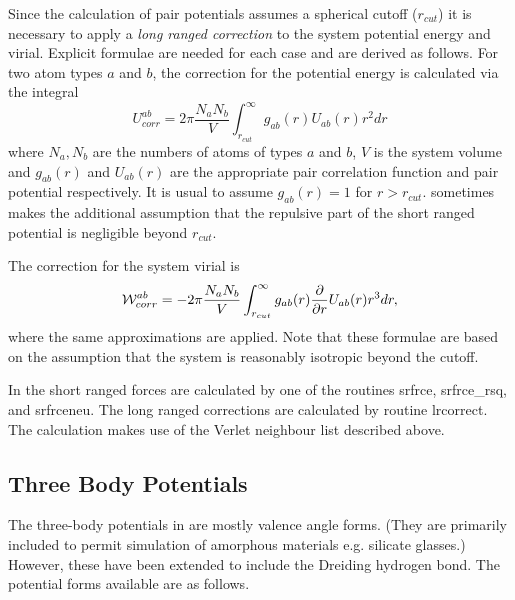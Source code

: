Since the calculation of pair potentials assumes a spherical cutoff
($r_{cut}$) it is necessary to apply a {\em long ranged
correction} to
the system potential energy and virial. Explicit formulae are needed
for each case and are derived as follows. For two atom types $a$ and
$b$, the correction for the potential energy is calculated via the
integral
\begin{equation}
U_{corr}^{ab}=2\pi
\frac{N_{a}N_{b}}{V}\int_{r_{cut}}^{\infty}g_{ab}(r)U_{ab}(r)r^{2}dr
\end{equation}
where $N_{a},N_{b}$ are the numbers of atoms of types $a$ and $b$, $V$
is the system volume and $g_{ab}(r)$ and $U_{ab}(r)$ are the
appropriate pair correlation function and pair potential respectively.
It is usual to assume $g_{ab}(r)=1$ for $r>r_{cut}$. \D{}
sometimes makes the additional assumption that the repulsive part of
the short ranged potential is negligible beyond $r_{cut}$. 

The correction for the system virial is
\begin{equation}
{\cal W}_{corr}^{ab}=-2\pi
\frac{N_{a}N_{b}}{V}\int_{r_{cut}}^{\infty}g_{ab}(r)\frac{\partial}{\partial
r}U_{ab}(r)r^{3}dr,
\end{equation}
where the same approximations are applied. Note that these formulae
are based on the assumption that the system is reasonably isotropic
beyond the cutoff.

In \D{} the short ranged forces are calculated by one of the
routines {\sc srfrce, srfrce\_rsq,} and {\sc srfrceneu}. The long
ranged corrections are calculated by routine {\sc lrcorrect}. The
calculation makes use of the Verlet neighbour list described above.

\subsection{Three Body Potentials}

The three-body potentials in \D{} are mostly
valence angle forms. (They are
primarily included to permit simulation of amorphous materials
e.g. silicate glasses.) However, these have been extended to include
the Dreiding \cite{mayo-90a} hydrogen
bond. The potential forms available are as follows.

